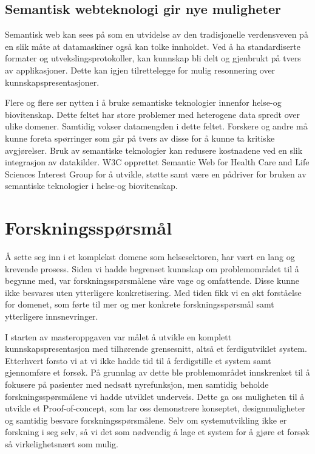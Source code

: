 \subsection{Semantisk webteknologi gir nye muligheter}
Semantisk web kan sees på som en utvidelse av den tradisjonelle verdensveven på en slik måte at datamaskiner også kan tolke innholdet. Ved å ha standardiserte formater og utvekslingsprotokoller, kan kunnskap bli delt og gjenbrukt på tvers av applikasjoner.
Dette kan igjen tilrettelegge for mulig resonnering over  kunnskapspresentasjoner. 

Flere og flere ser nytten i å bruke semantiske teknologier innenfor helse-og biovitenskap\citep{monitor_bipolar_semanticweb}\citep{semanticweb_clinical_guideline}. Dette feltet  har store problemer med heterogene data spredt over ulike domener. Samtidig vokser datamengden i dette feltet. Forskere og andre må kunne foreta spørringer som går på tvers av disse for å kunne ta kritiske avgjørelser. Bruk av semantiske teknologier kan redusere kostnadene ved en slik integrasjon av datakilder. W3C opprettet Semantic Web for Health Care and Life Sciences Interest Group for å utvikle, støtte samt være en pådriver for bruken av semantiske teknologier i helse-og biovitenskap\citep{W3C_HCLSIG}.

\section{Forskningsspørsmål}
Å sette seg inn i et komplekst domene som helsesektoren, har vært en lang og krevende prosess. Siden vi hadde begrenset kunnskap om problemområdet til å begynne med, var forskningsspørsmålene våre vage og omfattende. Disse kunne ikke besvares uten ytterligere konkretisering. Med tiden fikk vi en økt forståelse for domenet, som førte til mer og mer konkrete forskningsspørsmål samt ytterligere innsnevringer. 


I starten av masteroppgaven var målet å utvikle en komplett kunnskapspresentasjon med tilhørende grensesnitt, altså et ferdigutviklet system. Etterhvert forsto vi at vi ikke hadde tid til å ferdigstille et system samt gjennomføre et forsøk. På grunnlag av dette ble problemområdet innskrenket til å fokusere på pasienter med nedsatt nyrefunksjon, men samtidig beholde forskningsspørsmålene vi hadde utviklet underveis. Dette ga oss muligheten til å utvikle et Proof-of-concept, som lar oss demonstrere konseptet, designmuligheter og samtidig besvare forskningsspørsmålene. Selv om systemutvikling ikke er forskning i seg selv, så vi det som nødvendig å lage et system for å gjøre et forsøk så virkelighetsnært som mulig. 

